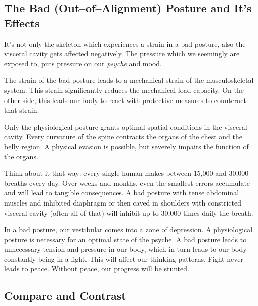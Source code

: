 \documentclass[../main.tex]{subfiles}
\begin{document}
\subsection[The Bad Posture and It's Effects]{The Bad (Out--of--Alignment) Posture and It's Effects}

It's not only the {skeleton} which experiences a strain in a bad posture, also the {visceral cavity} gets affected negatively.
The {pressure} which we seemingly are exposed to, puts pressure on our \emph{psyche} and mood.

The strain of the bad posture leads to a {mechanical strain} of the {musculoskeletal system}.
This strain significantly {reduces the mechanical load capacity}.
On the other side, this leads our body to react with {protective measures} to counteract that strain.

Only the physiological posture grants {optimal spatial conditions} in the visceral cavity.
Every curvature of the spine {contracts the organs} of the chest and the belly region.
A {physical evasion} is possible, but severely {impairs the function} of the organs.

Think about it that way: every single human makes between {15,000 and 30,000 breaths every day}.
Over weeks and months, even the smallest {errors accumulate} and will lead to tangible consequences.
A bad posture with {tense abdominal muscles} and {inhibited diaphragm} or then {caved in shoulders} with {constricted visceral cavity}
(often all of that) will inhibit up to 30,000 times daily the breath.

In a bad posture, our {vestibular} comes into a {zone of depression}.
A physiological posture is necessary for an optimal state of the psyche. 
A bad posture leads to {unnecessary tension and pressure} in our body, which in turn leads to our body constantly being in a {fight}.
This will affect our {thinking patterns}.
Fight never leads to peace.
Without peace, our progress will be stunted.

\newpage
\subsection{Compare and Contrast}
\end{document}
